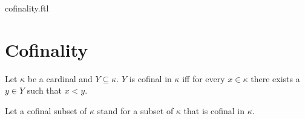 \documentclass{naproche-library}
\begin{document}
\begin{smodule}{cofinality.ftl}

  \section*{Cofinality}

  \begin{definition}[forthel,id=SET_THEORY_06_5621203645212879]
    Let $\kappa$ be a cardinal and $Y \subseteq \kappa$.
    $Y$ is cofinal in $\kappa$ iff for every $x \in \kappa$ there exists a $y \in Y$ such that $x < y$.

    Let a cofinal subset of $\kappa$ stand for a subset of $\kappa$ that is cofinal in $\kappa$.
  \end{definition}
\end{smodule}
\end{document}
